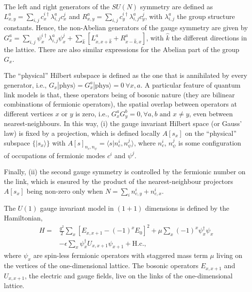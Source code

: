 \documentclass[epj,final]{svjour}
\begin{document}
The left and right generators of the $SU(N)$ symmetry are defined as $L^{a}_{x,y}=\sum_{i,j}  c^{i\dagger}_{x} \lambda^{a}_{i,j} c^{j}_{x}$ and $R^{a}_{x,y}=\sum_{i,j}  c^{i\dagger}_{y} \lambda^{a}_{i,j} c^{j}_{y}$, with $\lambda^{a}_{i,j}$ the group structure constants. Hence, the non-Abelian generators of the gauge symmetry are given by $G^{a}_{x} = \sum_{i,j} \psi^{i\dagger}_{x}  \lambda^{a}_{i,j} \psi^{j}_{x}+ \sum_{\hat{k}} \left[ L^{a}_{x,x+\hat{k}} + R^{a}_{x-\hat{k},x}  \right]$, with $\hat{k}$ the different directions in the  lattice. There  are  also  similar  expressions  for the Abelian part of the group $G_{x}$. 

The ``physical'' Hilbert subspace is defined as the one that is annihilated by every generator, i.e., $G_{x} |\text{phys}\rangle = G^{a}_{x} |\text{phys}\rangle= 0 ~ \forall x,a$. A particular feature of quantum link models is that, these operators being of bosonic nature (they are bilinear combinations of fermionic operators), the spatial overlap between operators at different vertices $x$ or $y$ is zero, i.e., $G^{a}_{x} G^{b}_{y}=0 , \forall a,b \text{ and } x\neq y$, even between nearest-neighbours.  In this way, (i) the gauge invariant Hilbert space (or Gauss' law) is fixed by a projection, which is defined locally $A\left[ s_{x} \right]$ on the ``physical'' subspace $\{ |s_{x} \rangle \}$ with $A\left[ s \right]_{ n_{c}, n_{\psi}}=\langle s | n^{i}_{c},n^{j}_{\psi} \rangle$, where $n^{i}_{c}$, $n^{j}_{\psi}$ is some configuration of occupations of fermionic modes $c^{i}$ and $\psi^{j}$.

Finally, (ii) the second gauge symmetry is controlled by the fermionic number on the link, which is ensured by the product of the nearest-neighbour projectors $A\left[ s_{x} \right]$ being non-zero only when $N= \sum_{i} n^{i}_{c,y}+ n^{i}_{c,x}$.

The $U(1)$ gauge invariant model in $(1+1)$ dimensions is defined by the Hamiltonian,
\begin{equation}
\begin{split}
H = &\frac{g^{2}}{2} \sum_{x} \left[ E_{x,x+1} - \left( -1 \right)^{x} E_{0} \right]^{2} + \mu \sum_{x} \left( -1 \right)^{x} \psi^{\dagger}_{x} \psi_{x} \\
&- \epsilon \sum_{x} \psi^{\dagger}_{x} U_{x, x+1} \psi_{x+1} + \text{H.c.},
\end{split}
\end{equation}
where $\psi_{x}$ are spin-less fermionic operators with staggered mass term $\mu$ living on the vertices of the one-dimensional lattice. The bosonic operators $E_{x,x+1}$ and $U_{x,x+1}$, the electric and gauge fields, live on the links of the one-dimensional lattice.
\end{document}
